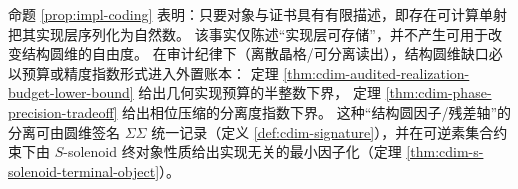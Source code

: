 \begin{remark}[实现层单射与审计预算的区分]\label{rem:cdim-coding-vs-audit}
命题 \ref{prop:impl-coding} 表明：只要对象与证书具有有限描述，即存在可计算单射把其实现层序列化为自然数。
该事实仅陈述“实现层可存储”，并不产生可用于改变结构圆维的自由度。
在审计纪律下（离散晶格/可分离读出），结构圆维缺口必以预算或精度指数形式进入外置账本：
定理 \ref{thm:cdim-audited-realization-budget-lower-bound} 给出几何实现预算的半整数下界，
定理 \ref{thm:cdim-phase-precision-tradeoff} 给出相位压缩的分离度指数下界。
这种“结构圆因子/残差轴”的分离可由圆维签名 \(\Sigma\Sigma\) 统一记录（定义 \ref{def:cdim-signature}），并在可逆素集合约束下由 \(S\)-solenoid 终对象性质给出实现无关的最小因子化（定理 \ref{thm:cdim-s-solenoid-terminal-object}）。
\end{remark}



\endinput
